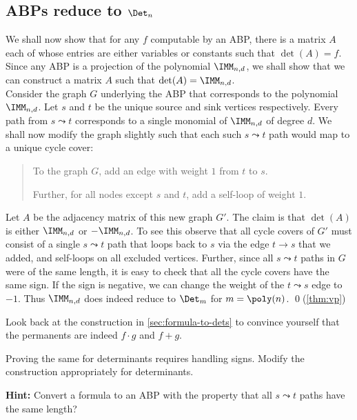 \subsection{ABPs reduce to $\Det_n$}

We shall now show that for any $f$ computable by an ABP, there is a matrix  $A$ each of whose entries are either variables or constants such that $\det(A) = f$.
Since any ABP is a projection of the polynomial $\IMM_{n,d}$, we shall show that we can construct a matrix  $A$  such that $\det(A) = \IMM_{n,d}$. \\

Consider the graph $G$ underlying the ABP that corresponds to the polynomial $\IMM_{n,d}$.
Let $s$ and $t$ be the unique source and sink vertices respectively.
Every path from $s\leadsto t$ corresponds to a single monomial of $\IMM_{n,d}$ of degree $d$.
We shall now modify the graph slightly such that each such $s\leadsto t$ path would map to a unique cycle cover:

\begin{quote}
  To the graph $G$, add an edge with weight $1$ from $t$ to $s$.

  Further, for all nodes except $s$ and $t$, add a self-loop of weight $1$.
\end{quote}

Let $A$ be the adjacency matrix of this new graph $G'$.
The claim is that $\det(A)$ is either $\IMM_{n,d}$ or $-\IMM_{n,d}$.
To see this observe that all cycle covers of $G'$ must consist of a single $s\leadsto t$ path that loops back to $s$ via the edge $t\rightarrow s$ that we added, and self-loops on all excluded vertices.
Further, since all $s\leadsto t$ paths in $G$ were of the same length, it is easy to check that all the cycle covers
have the same sign. If the sign is negative, we can change the weight of the $t\leadsto s$ edge to $-1$.
Thus $\IMM_{n,d}$ does indeed reduce to $\Det_m$ for $m = \poly(n)$. \qed {\footnotesize (\autoref{thm:vp})}\\

\begin{exercise}
Look back at the construction in \autoref{sec:formula-to-dets} to convince yourself that the permanents are indeed $f \cdot g$ and $f + g$.

Proving the same for determinants requires handling signs. Modify the construction appropriately for determinants.

{\bf Hint:} Convert a formula to an ABP with the property that all $s \leadsto t$ paths have the same length?
\end{exercise}


